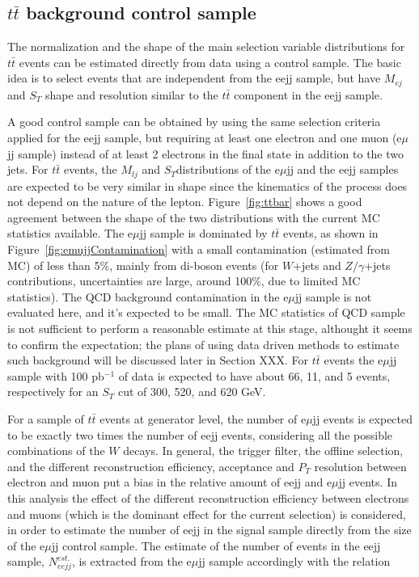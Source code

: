 \subsection{$t\bar{t}$ background control sample}

The normalization and the shape of the main selection variable distributions for 
$t\bar{t}$ events can be estimated directly from data using a control sample. 
The basic idea is to select events that are independent from the eejj sample, but have $M_{ej}$ and $S_{T}$ shape and resolution 
similar to the $t\bar{t}$ component in the eejj sample.

A good control sample can be obtained by using the same selection criteria applied for the eejj sample, but 
requiring at least one electron and one muon (e$\mu$jj sample) instead of at least 2 electrons 
in the final state in addition to the two jets. 
For $t\bar{t}$ events, the $M_{lj}$ and $S_{T}$distributions of the e$\mu$jj and the eejj samples
are expected to be very similar in shape since the kinematics of the process does not depend 
on the nature of the lepton. Figure~\ref{fig:ttbar} shows a good agreement between 
the shape of the two distributions with the current MC statistics available. 
The e$\mu$jj sample is dominated by $t\bar{t}$ events, as shown in Figure~\ref{fig:emujjContamination} 
with a small contamination (estimated from MC) of less than 5\%, mainly from di-boson events 
(for $W$+jets and $Z/\gamma$+jets contributions, uncertainties are large, around 100\%, due to limited MC statistics). 
The QCD background contamination in the e$\mu$jj sample is not evaluated here, and it's expected to be small. 
The MC statistics of QCD sample is not sufficient to perform a reasonable estimate at this stage, althought 
it seems to confirm the expectation; the plans of using data driven methods to estimate such background will be discussed later in Section XXX. 
For $t\bar{t}$ events the e$\mu$jj sample with 100 pb$^{-1}$ of data 
is expected to have about 66, 11, and 5 events, respectively for an $S_{T}$ cut of 300, 520, and 620 GeV.

For a sample of $t\bar{t}$ events at generator level, the number of e$\mu$jj events is expected to be exactly two times the number of 
eejj events, considering all the possible combinations of the $W$ decays. In general, the trigger filter, the offline selection, 
and the different reconstruction efficiency, acceptance and $P_{T}$ resolution between electron and muon
put a bias in the relative amount of eejj and e$\mu$jj events. 
In this analysis the effect of the different reconstruction efficiency between electrons and muons 
(which is the dominant effect for the current selection) 
is considered, in order to estimate the number of eejj in the signal sample directly from 
the size of the e$\mu$jj control sample. The estimate of the number of events in the eejj sample, 
$N_{eejj}^{est.}$, is extracted from the e$\mu$jj sample accordingly with the relation 

